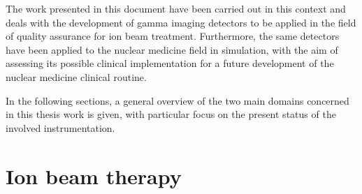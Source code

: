 The work presented in this document have been carried out in this context and deals with the development of gamma imaging detectors to be applied in the field of quality assurance for ion beam treatment. Furthermore, the same detectors have been applied to the nuclear medicine field in simulation, with the aim of assessing its possible clinical implementation for a future development of the nuclear medicine clinical routine. 

In the following sections, a general overview of the two main domains concerned in this thesis work is given, with particular focus on the present status of the involved instrumentation.       
  

\section{Ion beam therapy}\label{chap1::sec::ionBeamTher}

